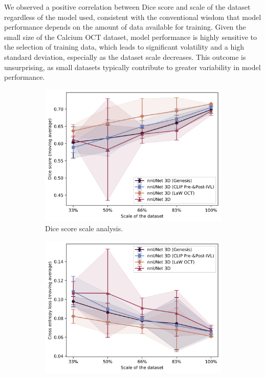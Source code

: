 \documentclass[a4paper,11pt,oneside]{report}
\begin{document}
We observed a positive correlation between Dice score and scale of the dataset regardless of the model used, consistent with the conventional wisdom that model performance depends on the amount of data available for training. Given the small size of the Calcium OCT dataset, model performance is highly sensitive to the selection of training data, which leads to significant volatility and a high standard deviation, especially as the dataset scale decreases. This outcome is unsurprising, as small datasets typically contribute to greater variability in model performance.

\begin{figure}[hbt]
    \centering
    \begin{subfigure}[t]{0.49\textwidth}
        \includegraphics[width=1\linewidth]{figures/discussion_scale_analysis.png}
        \caption{Dice score scale analysis.}
        \label{fig:scale-analysis}
    \end{subfigure}%
    \begin{subfigure}[t]{0.49\textwidth}
        \includegraphics[width=1\linewidth]{figures/discussion_cross_entropy_scale_analysis.png}

\end{subfigure}
\end{figure}
\end{document}

